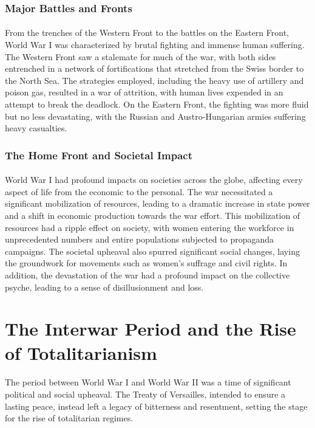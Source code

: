 \documentclass{book}
\begin{document}
\subsubsection*{Major Battles and Fronts}
\paragraph{}
From the trenches of the Western Front to the battles on the Eastern Front, World War I was characterized by brutal fighting and immense human suffering. The Western Front saw a stalemate for much of the war, with both sides entrenched in a network of fortifications that stretched from the Swiss border to the North Sea. The strategies employed, including the heavy use of artillery and poison gas, resulted in a war of attrition, with human lives expended in an attempt to break the deadlock. On the Eastern Front, the fighting was more fluid but no less devastating, with the Russian and Austro-Hungarian armies suffering heavy casualties. 

\subsubsection*{The Home Front and Societal Impact}
\paragraph{}
World War I had profound impacts on societies across the globe, affecting every aspect of life from the economic to the personal. The war necessitated a significant mobilization of resources, leading to a dramatic increase in state power and a shift in economic production towards the war effort. This mobilization of resources had a ripple effect on society, with women entering the workforce in unprecedented numbers and entire populations subjected to propaganda campaigns. The societal upheaval also spurred significant social changes, laying the groundwork for movements such as women’s suffrage and civil rights. In addition, the devastation of the war had a profound impact on the collective psyche, leading to a sense of disillusionment and loss. 

\section*{The Interwar Period and the Rise of Totalitarianism}
\paragraph{}
The period between World War I and World War II was a time of significant political and social upheaval. The Treaty of Versailles, intended to ensure a lasting peace, instead left a legacy of bitterness and resentment, setting the stage for the rise of totalitarian regimes.
\end{document}
